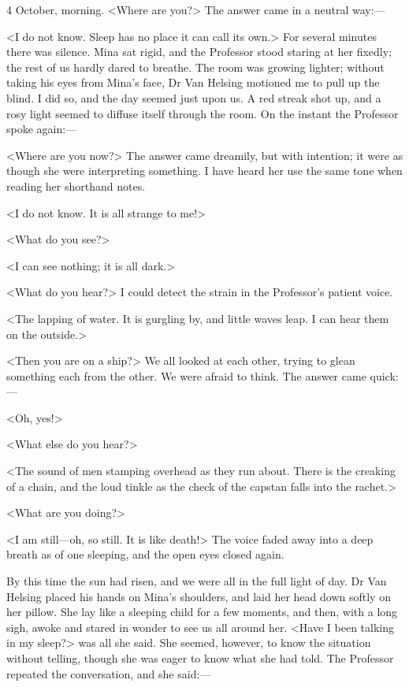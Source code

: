 \begin{diary}{4 October, morning.}
<Where are you?> The answer came in a neutral way:—

<I do not know. Sleep has no place it can call its own.> For several minutes there was silence. Mina sat rigid, and the Professor stood staring at her fixedly; the rest of us hardly dared to breathe. The room was growing lighter; without taking his eyes from Mina's face, Dr Van Helsing motioned me to pull up the blind. I did so, and the day seemed just upon us. A red streak shot up, and a rosy light seemed to diffuse itself through the room. On the instant the Professor spoke again:—

<Where are you now?> The answer came dreamily, but with intention; it were as though she were interpreting something. I have heard her use the same tone when reading her shorthand notes.

<I do not know. It is all strange to me!>

<What do you see?>

<I can see nothing; it is all dark.>

<What do you hear?> I could detect the strain in the Professor's patient voice.

<The lapping of water. It is gurgling by, and little waves leap. I can hear them on the outside.>

<Then you are on a ship?> We all looked at each other, trying to glean something each from the other. We were afraid to think. The answer came quick:—

<Oh, yes!>

<What else do you hear?>

<The sound of men stamping overhead as they run about. There is the creaking of a chain, and the loud tinkle as the check of the capstan falls into the rachet.>

<What are you doing?>

<I am still—oh, so still. It is like death!> The voice faded away into a deep breath as of one sleeping, and the open eyes closed again.

By this time the sun had risen, and we were all in the full light of day. Dr Van Helsing placed his hands on Mina's shoulders, and laid her head down softly on her pillow. She lay like a sleeping child for a few moments, and then, with a long sigh, awoke and stared in wonder to see us all around her. <Have I been talking in my sleep?> was all she said. She seemed, however, to know the situation without telling, though she was eager to know what she had told. The Professor repeated the conversation, and she said:—


\end{diary}
